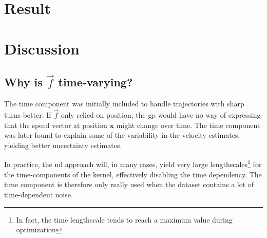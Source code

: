 \section{Result}


\section{Discussion}
\subsection{Why is $\vec{f}$ time-varying?}
The time component was initially included to handle trajectories with sharp turns better. If $\vec{f}$ only relied on position, the \acrshort{gp} would have no way of expressing that the speed vector at position $\boldsymbol{x}$ might change over time. The time component was later found to explain some of the variability in the velocity estimates, yielding better uncertainty estimates.

In practice, the \acrshort{ml} approach will, in many cases, yield very large lengthscales\footnote{In fact, the time lengthscale tends to reach a maximum value during optimization} for the time-components of the kernel, effectively disabling the time dependency. The time component is therefore only really used when the dataset contains a lot of time-dependent noise.


